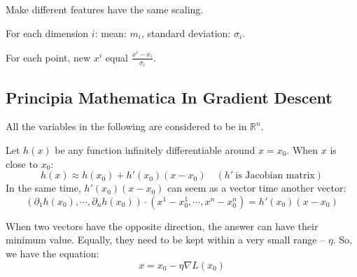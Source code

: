\documentclass{article}
\newenvironment{propblock}[1][\textbf{Proposition}]{\begin{tcolorbox}
[title = \textbf{#1}, colback=Salmon!20, colframe=Salmon!90!Black]}{\end{tcolorbox}}
\newenvironment{colblock}[1][\textbf{Collary}]{\begin{tcolorbox}[colback=JungleGreen!10!Cerulean!15,colframe=CornflowerBlue!60!Black,title = \textbf{#1}]}{\end{tcolorbox}}
\begin{document}
\begin{colblock}[Definition of Feature Scaling]
    Make different features have the same scaling.
\end{colblock}

\begin{propblock}[How To Do Feature Scaling]
    For each dimension $i$: mean: $m_i$, standard deviation: $\sigma_i$.
    
    For each point, new $x^i$ equal $\frac{x^i-x_i}{\sigma_i}$.
\end{propblock}

\subsection{Principia Mathematica In Gradient Descent}

All the variables in the following are considered to be in $\mathbb{R}^n$.

Let $h(x)$ be any function infinitely differentiable around $x = x_0$. When $x$ is close to $x_0$:
$$
h(x)\approx h(x_0)+h'(x_0)(x-x_0) \quad (h'\ \text{is Jacobian matrix})
$$
In the same time, $h'(x_0)(x-x_0)$ can seem as a vector time another vector:
$$
(\partial_1 h(x_0),\cdots,\partial_n h(x_0))\cdot (x^1-x_0^1,\cdots,x^n-x_0^n)=h'(x_0)(x-x_0)
$$

When two vectors have the opposite direction, the answer can have their minimum value. Equally, they need to be kept within a very small range -- $\eta$. So, we have the equation:
$$
x = x_0 - \eta \nabla L(x_0)
$$
\end{document}
